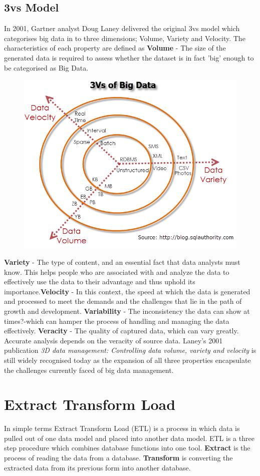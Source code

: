 \subsection{3vs Model}
In 2001, Gartner analyst Doug Laney delivered the original 3vs model which categorises big data in to three dimensions; Volume, Variety and Velocity.  The characteristics of each property are defined as \textbf{Volume} - The size of the generated data is required to assess whether the dataset is in fact 'big' enough to be categorised as Big Data. \begin{figure}\includegraphics[width = 1\linewidth]{images/3vs}\end{figure} \textbf{Variety} - The type of content, and an essential fact that data analysts must know. This helps people who are associated with and analyze the data to effectively use the data to their advantage and thus uphold its importance.\textbf{Velocity} - In this context, the speed at which the data is generated and processed to meet the demands and the challenges that lie in the path of growth and development. \textbf{Variability} - The inconsistency the data can show at times?-which can hamper the process of handling and managing the data effectively. \textbf{Veracity} - The quality of captured data, which can vary greatly. Accurate analysis depends on the veracity of source data. Laney's 2001 publication \textit{3D data management: Controlling data volume, variety and velocity} is still widely recognised today as the expansion of all three properties encapsulate the challenges currently faced of big data management.

\section{Extract Transform Load}\label{etl}
In simple terms Extract Transform Load (ETL) is a process in which data is pulled out of one data model and placed into another data model. ETL is a three step procedure which combines database functions into one tool. \textbf{Extract} is the process of reading the data from a database. \textbf{Transform} is converting the extracted data from its previous form into another database.